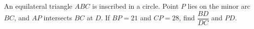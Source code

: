 An equilateral triangle $ABC$ is inscribed in a circle. Point $P$ lies on the minor arc $BC$, and $AP$ intersects $BC$ at $D$. If $BP=21$ and $CP=28$, find $\dfrac{BD}{DC}$ and $PD$.
